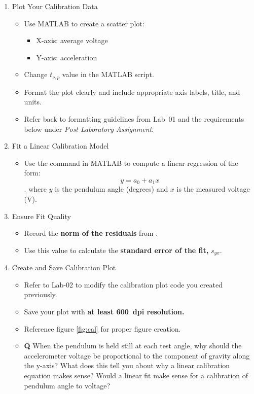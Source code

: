 \documentclass{article} %
\begin{document}
\begin{enumerate}[resume]
    \item Plot Your Calibration Data
    \begin{itemize}
        \item Use MATLAB to create a scatter plot:
        \begin{itemize}
            \item X-axis: average voltage
            \item Y-axis: acceleration
        \end{itemize}
        \item Change $t_{\nu,p}$ value in the MATLAB script.
        \item Format the plot clearly and include appropriate axis labels, title, and units.
        \item Refer back to formatting guidelines from Lab~01 and the requirements below under \textit{Post Laboratory Assignment}.
    \end{itemize}
    \item Fit a Linear Calibration Model
    \begin{itemize}
        \item Use the  command in MATLAB to compute a linear regression of the form: \[y = {a_0} + {a_1}x\]. where $y$ is the pendulum angle (degrees) and $x$ is the measured voltage (V).
    \end{itemize}
    \item Ensure Fit Quality
    \begin{itemize}
        \item Record the \textbf{norm of the residuals} from .
        \item Use this value to calculate the \textbf{standard error of the fit,} $s_{yx}$.
    \end{itemize}
    \item Create and Save Calibration Plot
    \begin{itemize}
        \item Refer to Lab-02 to modify the calibration plot code you created previously.
        \item Save your plot with \textbf{at least 600~dpi resolution.}
        \item Reference figure \ref{fig:cal} for proper figure creation.
        \item{\textbf{Q}} When the pendulum is held still at each test angle, why should the accelerometer voltage be proportional to the component of gravity along the y-axis? What does this tell you about why a linear calibration equation makes sense? Would a linear fit make sense for a calibration of pendulum angle to voltage?
    \end{itemize}
\end{enumerate}
\end{document}
